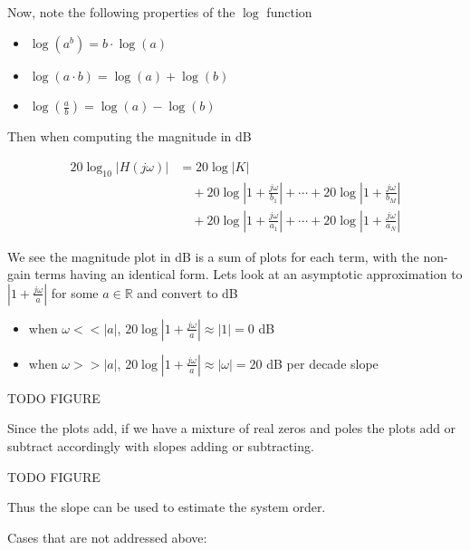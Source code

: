 \documentclass{article}
\begin{document}
Now, note the following properties of the $\log$ function

\begin{itemize}
\item $\log\left(a^b\right) = b\cdot \log(a)$
\item $\log(a\cdot b) = \log(a) + \log(b)$
\item $\log\left(\frac{a}{b}\right) = \log(a) - \log(b)$
\end{itemize}

Then when computing the magnitude in dB

\begin{align*}
  20\log_{10} \left|H(j\omega)\right| &= 20\log|K|\\
  &\quad + 20\log\left|1+\frac{j\omega}{b_{1}}\right| + \cdots + 20\log\left|1+\frac{j\omega}{b_{M}}\right|\\
  &\quad + 20\log\left|1+\frac{j\omega}{a_{1}}\right| + \cdots + 20\log\left|1+\frac{j\omega}{a_{N}}\right|
\end{align*}

We see the magnitude plot in dB is a sum of plots for each term, with the non-gain terms having an identical form. Lets look at an asymptotic approximation to $\left|1+\frac{j\omega}{a}\right|$ for some $a\in\mathbb{R}$ and convert to dB

\begin{itemize}
\item when $\omega << |a|$, $20\log\left|1+\frac{j\omega}{a}\right| \approx \left|1\right| = 0$ dB
\item when $\omega >> |a|$, $20\log\left|1+\frac{j\omega}{a}\right| \approx \left|\omega\right| = 20$ dB per decade slope 
\end{itemize}

TODO FIGURE

Since the plots add, if we have a mixture of real zeros and poles the plots add or subtract accordingly with slopes adding or subtracting.

TODO FIGURE

Thus the slope can be used to estimate the system order.


Cases that are not addressed above:
\end{document}
